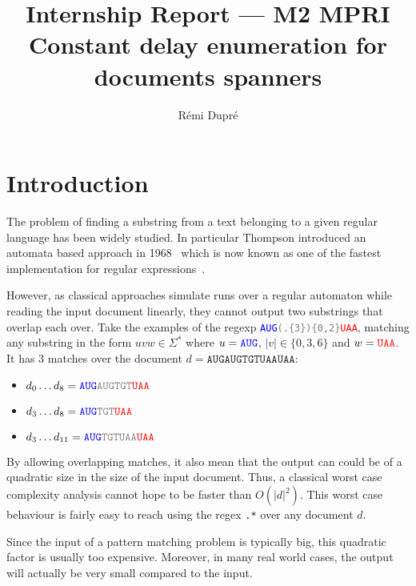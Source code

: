 \documentclass[12px]{article}
\title{%
  Internship Report --- M2 MPRI \\
  Constant delay enumeration for documents spanners
}
\author{Rémi Dupré}
\begin{document}
  \maketitle

  
  \pagebreak


  \section{Introduction}

    The problem of finding a substring from a text belonging to a given
    regular language has been widely studied. In particular Thompson
    introduced an automata based approach in
    1968~\cite{thompson1968programming} which is now known as one of the
    fastest implementation for regular expressions~\cite{cox2007regular}.

    However, as classical approaches simulate runs over a regular automaton
    while reading the input document linearly, they cannot output two
    substrings that overlap each over. Take the examples of the regexp
    \texttt{\textcolor{blue}{AUG}\textcolor{gray}{(.\{3\})\{0,2\}}\textcolor{red}{UAA}},
    matching any substring in the form $uvw \in \Sigma^*$ where $u =
    \texttt{\textcolor{blue}{AUG}}$, $|v| \in \{0, 3, 6\}$ and $w =
    \texttt{\textcolor{red}{UAA}}$. It has 3 matches over the document $d =
    \texttt{AUGAUGTGTUAAUAA}$:
    \begin{itemize}
      \item $d_0 \ldots d_8 =
        \texttt{\textcolor{blue}{AUG}\textcolor{gray}{AUGTGT}\textcolor{red}{UAA}}$
      \item $d_3 \ldots d_8 =
        \texttt{\textcolor{blue}{AUG}\textcolor{gray}{TGT}\textcolor{red}{UAA}}$
      \item $d_3 \ldots d_{11} =
        \texttt{\textcolor{blue}{AUG}\textcolor{gray}{TGTUAA}\textcolor{red}{UAA}}$
    \end{itemize}

    By allowing overlapping matches, it also mean that the output can could be
    of a quadratic size in the size of the input document. Thus, a classical
    worst case complexity analysis cannot hope to be faster than $O(|d|^2)$.
    This worst case behaviour is fairly easy to reach using the regex
    \texttt{.*} over any document $d$.

    Since the input of a pattern matching problem is typically big, this
    quadratic factor is usually too expensive. Moreover, in many real world
    cases, the output will actually be very small compared to the input.
\end{document}
